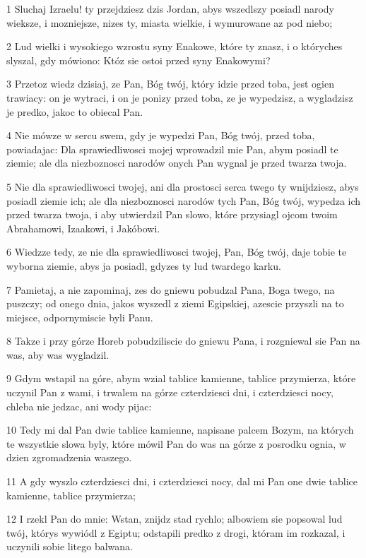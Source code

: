 \par 1 Sluchaj Izraelu! ty przejdziesz dzis Jordan, abys wszedlszy posiadl narody wieksze, i mozniejsze, nizes ty, miasta wielkie, i wymurowane az pod niebo;
\par 2 Lud wielki i wysokiego wzrostu syny Enakowe, które ty znasz, i o któryches slyszal, gdy mówiono: Któz sie ostoi przed syny Enakowymi?
\par 3 Przetoz wiedz dzisiaj, ze Pan, Bóg twój, który idzie przed toba, jest ogien trawiacy: on je wytraci, i on je ponizy przed toba, ze je wypedzisz, a wygladzisz je predko, jakoc to obiecal Pan.
\par 4 Nie mówze w sercu swem, gdy je wypedzi Pan, Bóg twój, przed toba, powiadajac: Dla sprawiedliwosci mojej wprowadzil mie Pan, abym posiadl te ziemie; ale dla niezboznosci narodów onych Pan wygnal je przed twarza twoja.
\par 5 Nie dla sprawiedliwosci twojej, ani dla prostosci serca twego ty wnijdziesz, abys posiadl ziemie ich; ale dla niezboznosci narodów tych Pan, Bóg twój, wypedza ich przed twarza twoja, i aby utwierdzil Pan slowo, które przysiagl ojcom twoim Abrahamowi, Izaakowi, i Jakóbowi.
\par 6 Wiedzze tedy, ze nie dla sprawiedliwosci twojej, Pan, Bóg twój, daje tobie te wyborna ziemie, abys ja posiadl, gdyzes ty lud twardego karku.
\par 7 Pamietaj, a nie zapominaj, zes do gniewu pobudzal Pana, Boga twego, na puszczy; od onego dnia, jakos wyszedl z ziemi Egipskiej, azescie przyszli na to miejsce, odpornymiscie byli Panu.
\par 8 Takze i przy górze Horeb pobudziliscie do gniewu Pana, i rozgniewal sie Pan na was, aby was wygladzil.
\par 9 Gdym wstapil na góre, abym wzial tablice kamienne, tablice przymierza, które uczynil Pan z wami, i trwalem na górze czterdziesci dni, i czterdziesci nocy, chleba nie jedzac, ani wody pijac:
\par 10 Tedy mi dal Pan dwie tablice kamienne, napisane palcem Bozym, na których te wszystkie slowa byly, które mówil Pan do was na górze z posrodku ognia, w dzien zgromadzenia waszego.
\par 11 A gdy wyszlo czterdziesci dni, i czterdziesci nocy, dal mi Pan one dwie tablice kamienne, tablice przymierza;
\par 12 I rzekl Pan do mnie: Wstan, znijdz stad rychlo; albowiem sie popsowal lud twój, którys wywiódl z Egiptu; odstapili predko z drogi, któram im rozkazal, i uczynili sobie litego balwana.
